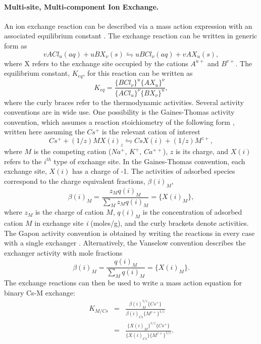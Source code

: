 \paragraph{Multi-site, Multi-component Ion Exchange.}
An ion exchange reaction can be described via a mass action expression
with an associated equilibrium constant \citep{vanselow-1932,sposito-1981,appelo-1993}.  
The exchange reaction can be written in generic form as
\begin{equation}
  vACl_{u} (aq)+uBX_{\nu } (s)\leftrightharpoons uBCl_{\nu } (aq)+vAX_{u} (s),
\end{equation} 
where X refers to the exchange site occupied by the cations $A^{u+}$ and $B^{v+}$.  
The equilibrium constant, $K_{eq}$, for this reaction can be written as \citep{vanselow-1932}
\begin{equation}
  K_{eq} =\frac{\{BCl_{\nu } \}^{u} \{AX_{u}\}^{\nu } }{\{ACl_{u} \}^{\nu } \{BX_{\nu } \}^{u} },
\end{equation} 
where the curly braces refer to the thermodynamic activities.
Several activity conventions are in wide use.  One possibility is the
Gaines-Thomas activity convention, which assumes a reaction
stoichiometry of the following form \citep{appelo-1993}, written
here assuming the $Cs^+$ is the relevant cation of interest
\begin{equation}
  Cs^{+} + (1/z) MX(i)_{z} \leftrightharpoons CsX(i) + (1/z) M^{z+},
\end{equation} 
where $M$ is the competing cation ($Na^+$, $K^+$, $Ca^{++}$), $z$ is
its charge, and $X(i)$ refers to the $i^{th}$ type of exchange site.  
In the Gaines-Thomas convention, each exchange site, $X(i)$ has a charge of -1. 
The activities of adsorbed species correspond to the charge equivalent fractions, $\beta (i)_{M} $,
\begin{equation}
  \beta (i)_{M} =\frac{z_{M} q(i)_{M} }{\sum _{M}z_{M} q(i)_{M}  } = \{X(i)_{M} \},
\end{equation} 
where $z_M$ is the charge of cation $M$, $q(i)_M$ is the concentration
of adsorbed cation $M$ in exchange site \textit{i} (moles/g),
and the curly brackets denote activities.  
The Gapon activity convention is obtained by writing the reactions in every case with a
single exchanger \citep{appelo-1993}.  
Alternatively, the Vanselow convention \citep{vanselow-1932} describes the exchanger activity
with mole fractions
\begin{equation}
  \beta (i)_{M} =\frac{q(i)_{M} }{\sum _{M}q(i)_{M}  } = \{ X(i)_{M} \}.
\end{equation} 
The exchange reactions can then be used to write a mass action equation for binary Cs-M exchange:
\begin{eqnarray}
  K_{M/Cs} & = & \frac{\beta (i)_{M} ^{1/z} \{Cs^{+} \}}{\beta (i)_{Cs} \{M^{z+} \}^{1/z} } \\
  & = & 
\frac{\{X(i)_{M} \}^{1/z} \{Cs^{+} \}}{\{X(i)_{Cs} \}\{M^{z+} \}^{1/z} } .
\end{eqnarray}

